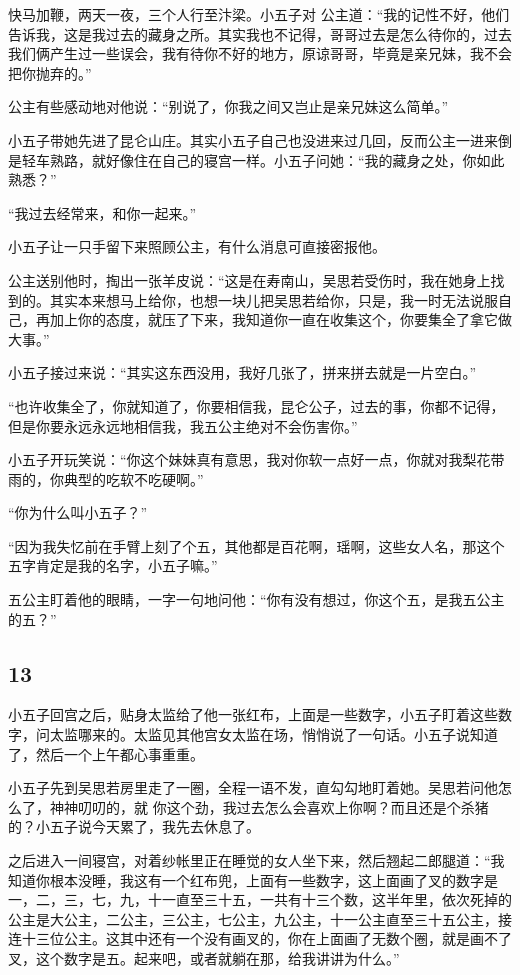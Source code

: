 快马加鞭，两天一夜，三个人行至汴梁。小五子对
公主道：“我的记性不好，他们告诉我，这是我过去的藏身之所。其实我也不记得，哥哥过去是怎么待你的，过去我们俩产生过一些误会，我有待你不好的地方，原谅哥哥，毕竟是亲兄妹，我不会把你抛弃的。”

公主有些感动地对他说：“别说了，你我之间又岂止是亲兄妹这么简单。”

小五子带她先进了昆仑山庄。其实小五子自己也没进来过几回，反而公主一进来倒是轻车熟路，就好像住在自己的寝宫一样。小五子问她：“我的藏身之处，你如此熟悉？”

“我过去经常来，和你一起来。”

小五子让一只手留下来照顾公主，有什么消息可直接密报他。

公主送别他时，掏出一张羊皮说：“这是在寿南山，吴思若受伤时，我在她身上找到的。其实本来想马上给你，也想一块儿把吴思若给你，只是，我一时无法说服自己，再加上你的态度，就压了下来，我知道你一直在收集这个，你要集全了拿它做大事。”

小五子接过来说：“其实这东西没用，我好几张了，拼来拼去就是一片空白。”

“也许收集全了，你就知道了，你要相信我，昆仑公子，过去的事，你都不记得，但是你要永远永远地相信我，我五公主绝对不会伤害你。”

小五子开玩笑说：“你这个妹妹真有意思，我对你软一点好一点，你就对我梨花带雨的，你典型的吃软不吃硬啊。”

“你为什么叫小五子？”

“因为我失忆前在手臂上刻了个五，其他都是百花啊，瑶啊，这些女人名，那这个五字肯定是我的名字，小五子嘛。”

五公主盯着他的眼睛，一字一句地问他：“你有没有想过，你这个五，是我五公主的五？”
\newline

{\centering\subsection{13}}

小五子回宫之后，贴身太监给了他一张红布，上面是一些数字，小五子盯着这些数字，问太监哪来的。太监见其他宫女太监在场，悄悄说了一句话。小五子说知道了，然后一个上午都心事重重。

小五子先到吴思若房里走了一圈，全程一语不发，直勾勾地盯着她。吴思若问他怎么了，神神叨叨的，就
你这个劲，我过去怎么会喜欢上你啊？而且还是个杀猪的？小五子说今天累了，我先去休息了。

之后进入一间寝宫，对着纱帐里正在睡觉的女人坐下来，然后翘起二郎腿道：“我知道你根本没睡，我这有一个红布兜，上面有一些数字，这上面画了叉的数字是一，二，三，七，九，十一直至三十五，一共有十三个数，这半年里，依次死掉的公主是大公主，二公主，三公主，七公主，九公主，十一公主直至三十五公主，接连十三位公主。这其中还有一个没有画叉的，你在上面画了无数个圈，就是画不了叉，这个数字是五。起来吧，或者就躺在那，给我讲讲为什么。”

